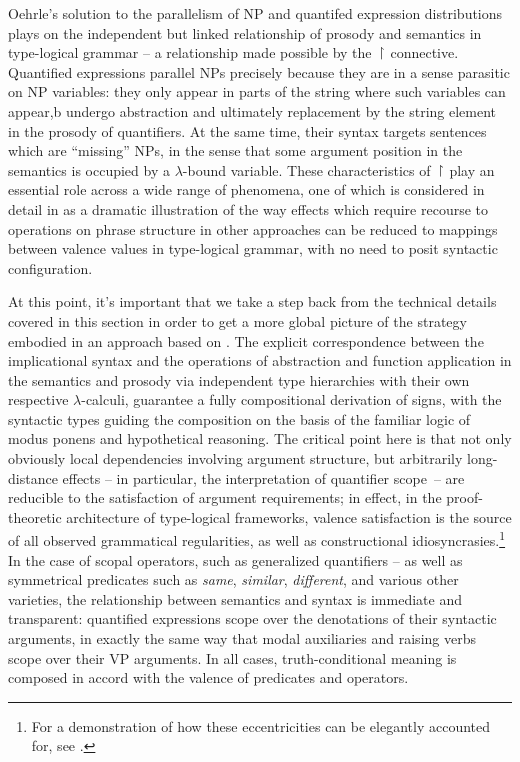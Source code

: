 \documentclass[output=paper,colorlinks,citecolor=brown]{langscibook}
\begin{document}
Oehrle's solution to the parallelism of NP and quantifed expression
distributions plays on the independent but linked relationship of
prosody and semantics in type-logical grammar -- a relationship made
possible by the \ensuremath{\vs} connective. Quantified expressions parallel NPs
precisely because they are in a sense parasitic on NP variables: they
only appear in parts of the string where such variables can appear,b
undergo abstraction and ultimately replacement by the string element
in the prosody of quantifiers. At the same time, their syntax targets
sentences which are ``missing'' NPs, in the sense that some argument
position in the semantics is occupied by a $\lambda$-bound variable. These
characteristics of \ensuremath{\vs} play an essential role across a wide range of
phenomena, one of which is considered in detail in  as
a dramatic illustration of the way effects which require recourse to
operations on phrase structure in other approaches can be reduced to
mappings between valence values in type-logical grammar, with no need
to posit syntactic configuration.\largerpage



At this point, it's important that we take a step back from the
technical details covered in this section in order to get a more
global picture of the strategy embodied in an approach based on
. The explicit correspondence between the implicational syntax
and the operations of abstraction and function application in the
semantics and prosody via independent type hierarchies with their own
respective $\lambda$-calculi, guarantee a fully compositional derivation of
signs, with the syntactic types guiding the composition on the basis
of the familiar logic of modus ponens and hypothetical reasoning. The
critical point here is that not only obviously local dependencies
involving argument structure, but arbitrarily long-distance
effects -- in particular, the interpretation of quantifier scope~-- are
reducible to the satisfaction of argument requirements; in effect, in
the proof-theoretic architecture of type-logical frameworks, valence
satisfaction is the source of all observed grammatical regularities,
as well as constructional idiosyncrasies.{\footnote{For
a demonstration of how these eccentricities can be elegantly accounted
for, see \citet{kubota-levine2022a}.}} In the case of scopal operators, such
as generalized quantifiers -- as well as symmetrical predicates such as
\textit{same}, \textit{similar}, \textit{different}, and various other varieties, the
relationship between semantics and syntax is immediate and
transparent: quantified expressions scope over the denotations of
their syntactic arguments, in exactly the same way that modal
auxiliaries and raising verbs scope over their VP arguments. In all
cases, truth-conditional meaning is composed in accord with the
valence of predicates and operators.
\end{document}
